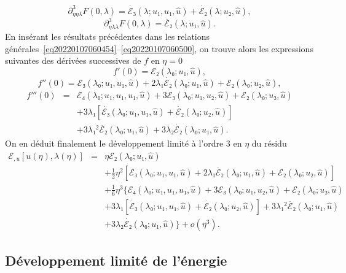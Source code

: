 \documentclass[12pt, final]{amsart}
\theoremstyle{definition}
\begin{document}
\begin{equation}
 \partial_{η η λ}^3 F(0, λ) =
 \dot{ℰ₃}(λ ; u₁, u₁, \hat{u}) + \dot{ℰ₂}
 (λ ; u₂, \hat{u}),
\end{equation}
\begin{equation}
 \partial_{η λ λ}^3 F(0, λ) =
 \ddot{ℰ₂}(λ ; u₁, \hat{u}) .
\end{equation}
En insérant les résultats précédentes dans les relations générales~\eqref{eq20220107060454}--\eqref{eq20220107060500}, on trouve alors les expressions suivantes des dérivées successives de \(f\) en \(η = 0\)
\begin{equation}
 f'(0) =ℰ₂(λ₀ ; u₁, \hat{u}),
\end{equation}
\begin{equation}
 f''(0) =ℰ₃(λ₀ ; u₁, u₁, \hat{u}) + 2 λ₁
 \dot{ℰ₂}(λ₀ ; u₁, \hat{u}) +ℰ₂(λ₀ ;
 u₂, \hat{u}),
\end{equation}
\begin{eqnarray}
 f'''(0) & = & ℰ₄(λ₀ ; u₁, u₁, u₁, \hat{u}) +
 3ℰ₃(λ₀ ; u₁, u₂, \hat{u}) +ℰ₂(λ₀ ;
 u₃, \hat{u}) \nonumber\\
 & & + 3 λ₁ [\dot{ℰ₃}(λ₀ ; u₁, u₁,
 \hat{u}) + \dot{ℰ₂}(λ₀ ; u₂, \hat{u})] \nonumber\\
 & & + 3 λ₁^2 \ddot{ℰ₂}(λ₀ ; u₁,
 \hat{u}) + 3 λ₂ \dot{ℰ₂}(λ₀ ; u₁, \hat{u}) .
\end{eqnarray}
On en déduit finalement le développement limité à l'ordre 3 en \(η\) du résidu
\begin{eqnarray}
 ℰ_{, u} [u(η), λ(η)] & = & η ℰ₂
 (λ₀ ; u₁, \hat{u}) \nonumber\\
 & & + \tfrac{1}{2} η^2 [ℰ₃(λ₀ ; u₁, u₁,
 \hat{u}) + 2 λ₁ \dot{ℰ₂}(λ₀ ; u₁, \hat{u})
 +ℰ₂(λ₀ ; u₂, \hat{u})] \nonumber\\
 & & + \tfrac{1}{6} η^3 \{ ℰ₄(λ₀ ; u₁,
 u₁, u₁, \hat{u}) + 3ℰ₃(λ₀ ; u₁, u₂, \hat{u})
  +ℰ₂(λ₀ ; u₃, \hat{u}) \nonumber\\
 & & + 3 λ₁ [\dot{ℰ₃}(λ₀ ; u₁, u₁,
 \hat{u}) + \dot{ℰ₂}(λ₀ ; u₂, \hat{u})] + 3 λ₁^2
 \ddot{ℰ₂}(λ₀ ; u₁, \hat{u}) \nonumber\\
 & &  + 3 λ₂ \dot{ℰ₂}(λ₀ ;
 u₁, \hat{u}) \} + o(η^3) . \label{eq:20220107080901}
\end{eqnarray}
\subsection{Développement limité de l'énergie}\label{sec:DL
energie}
\end{document}
